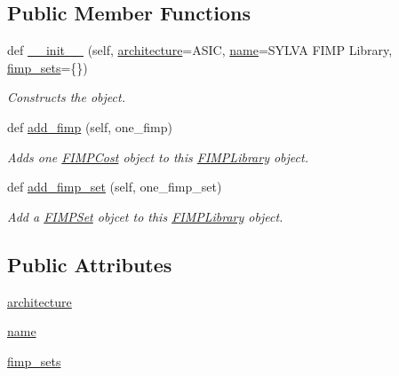 \subsection*{Public Member Functions}
\begin{DoxyCompactItemize}
\item 
def \hyperlink{classsylva_1_1base_1_1fimp_1_1_f_i_m_p_library_adbf53b929d21e18b2b57b792a78a7238}{\+\_\+\+\_\+init\+\_\+\+\_\+} (self, \hyperlink{classsylva_1_1base_1_1fimp_1_1_f_i_m_p_library_a1ba72f18ffa3b1e87c7e0eff1086d0ce}{architecture}=\textquotesingle{}A\+S\+IC\textquotesingle{}, \hyperlink{classsylva_1_1base_1_1fimp_1_1_f_i_m_p_library_a2799e2d0e2b692134faa3818a970247b}{name}=\textquotesingle{}S\+Y\+L\+VA F\+I\+MP Library\textquotesingle{}, \hyperlink{classsylva_1_1base_1_1fimp_1_1_f_i_m_p_library_afc2c121670a583e90dc26952815a6613}{fimp\+\_\+sets}=\{\})
\begin{DoxyCompactList}\small\item\em Constructs the object. \end{DoxyCompactList}\item 
def \hyperlink{classsylva_1_1base_1_1fimp_1_1_f_i_m_p_library_af156e65fec1988518374cd97ea3f7bdb}{add\+\_\+fimp} (self, one\+\_\+fimp)
\begin{DoxyCompactList}\small\item\em Adds one \hyperlink{classsylva_1_1base_1_1fimp_1_1_f_i_m_p_cost}{F\+I\+M\+P\+Cost} object to this \hyperlink{classsylva_1_1base_1_1fimp_1_1_f_i_m_p_library}{F\+I\+M\+P\+Library} object. \end{DoxyCompactList}\item 
def \hyperlink{classsylva_1_1base_1_1fimp_1_1_f_i_m_p_library_a43972e3c5de908178269b08f7c79c2af}{add\+\_\+fimp\+\_\+set} (self, one\+\_\+fimp\+\_\+set)
\begin{DoxyCompactList}\small\item\em Add a \hyperlink{classsylva_1_1base_1_1fimp_1_1_f_i_m_p_set}{F\+I\+M\+P\+Set} objcet to this \hyperlink{classsylva_1_1base_1_1fimp_1_1_f_i_m_p_library}{F\+I\+M\+P\+Library} object. \end{DoxyCompactList}\end{DoxyCompactItemize}
\subsection*{Public Attributes}
\begin{DoxyCompactItemize}
\item 
\hyperlink{classsylva_1_1base_1_1fimp_1_1_f_i_m_p_library_a1ba72f18ffa3b1e87c7e0eff1086d0ce}{architecture}
\item 
\hyperlink{classsylva_1_1base_1_1fimp_1_1_f_i_m_p_library_a2799e2d0e2b692134faa3818a970247b}{name}
\item 
\hyperlink{classsylva_1_1base_1_1fimp_1_1_f_i_m_p_library_afc2c121670a583e90dc26952815a6613}{fimp\+\_\+sets}
\end{DoxyCompactItemize}
